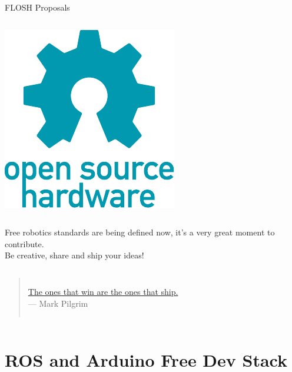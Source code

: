 \begin{frame}{FLOSH Proposals}
\begin{columns}
\begin{center}
          \includegraphics[width=.8\textwidth]{vendor/images/oshw-logo.pdf}
        \end{center}
    \end{columns}
  \end{frame}

  \begin{frame}
    \vfill
    Free robotics standards are being defined now, it's a very great moment to contribute.\\
    Be creative, share and ship your ideas!
    \vfill\vfill
    \begin{columns}
        \begin{quote}
          \hfill{}\hspace{.3em}\small \href{http://diveintohtml5.info/past.html}{The ones that win are the ones that ship.}\normalsize\hspace{.5em}\\
          \hfill \small --- Mark Pilgrim \cite{pilgrim2010html5}\normalsize
        \end{quote}
    \end{columns}
  \end{frame}

\section{ROS and Arduino Free Dev Stack}

